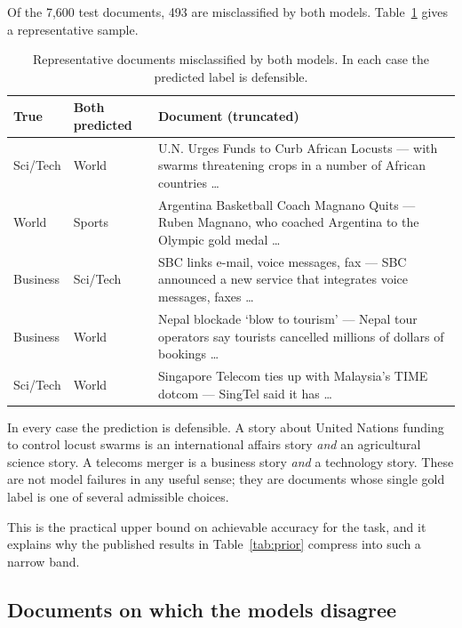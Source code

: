 Of the 7{,}600 test documents, 493 are misclassified by both models. Table~\ref{tab:both_wrong}
gives a representative sample.

\begin{table}[ht]
\centering
\caption[Documents misclassified by both models]{Representative documents misclassified by both
models. In each case the predicted label is defensible.}
\label{tab:both_wrong}
\begin{tabular}{llp{7.3cm}}
\toprule
\textbf{True} & \textbf{Both predicted} & \textbf{Document (truncated)} \\
\midrule
Sci/Tech & World    & U.N. Urges Funds to Curb African Locusts --- with swarms threatening crops in a number of African countries \ldots \\
World    & Sports   & Argentina Basketball Coach Magnano Quits --- Ruben Magnano, who coached Argentina to the Olympic gold medal \ldots \\
Business & Sci/Tech & SBC links e-mail, voice messages, fax --- SBC announced a new service that integrates voice messages, faxes \ldots \\
Business & World    & Nepal blockade `blow to tourism' --- Nepal tour operators say tourists cancelled millions of dollars of bookings \ldots \\
Sci/Tech & World    & Singapore Telecom ties up with Malaysia's TIME dotcom --- SingTel said it has \ldots \\
\bottomrule
\end{tabular}
\end{table}

In every case the prediction is defensible. A story about United Nations funding to control locust
swarms is an international affairs story \emph{and} an agricultural science story. A telecoms
merger is a business story \emph{and} a technology story. These are not model failures in any
useful sense; they are documents whose single gold label is one of several admissible choices.

This is the practical upper bound on achievable accuracy for the task, and it explains why the
published results in Table~\ref{tab:prior} compress into such a narrow band.

\subsection{Documents on which the models disagree}

